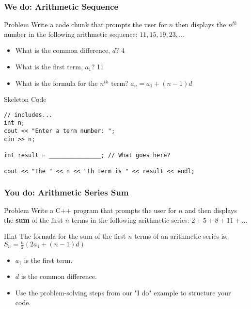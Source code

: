 \documentclass{beamer}
\begin{document}
\begin{frame}[fragile]
\frametitle{We do: Arithmetic Sequence}
\begin{block}{Problem}
Write a code chunk that prompts the user for $n$ then displays the $n^{th}$ number in the following arithmetic sequence: $11, 15, 19, 23, ...$
\end{block}

\begin{itemize}
    \item What is the common difference, $d$? \alert{4}
    \item What is the first term, $a_1$? \alert{11}
    \item What is the formula for the $n^{th}$ term? $a_n = a_1 + (n-1)d$
\end{itemize}

\begin{block}{Skeleton Code}
\begin{verbatim}
// includes...
int n;
cout << "Enter a term number: ";
cin >> n;

int result = _______________; // What goes here?

cout << "The " << n << "th term is " << result << endl;
\end{verbatim}
\end{block}
\end{frame}

\begin{frame}
\frametitle{You do: Arithmetic Series Sum}
\begin{block}{Problem}
Write a C++ program that prompts the user for $n$ and then displays the \textbf{sum} of the first $n$ terms in the following arithmetic series:
$2 + 5 + 8 + 11 + ...$
\end{block}

\begin{alertblock}{Hint}
The formula for the sum of the first $n$ terms of an arithmetic series is:
$S_n = \frac{n}{2}(2a_1 + (n-1)d)$
\begin{itemize}
    \item $a_1$ is the first term.
    \item $d$ is the common difference.
\end{itemize}
\end{alertblock}

\begin{itemize}
    \item Use the problem-solving steps from our "I do" example to structure your code.
\end{itemize}
\end{frame}
\end{document}
